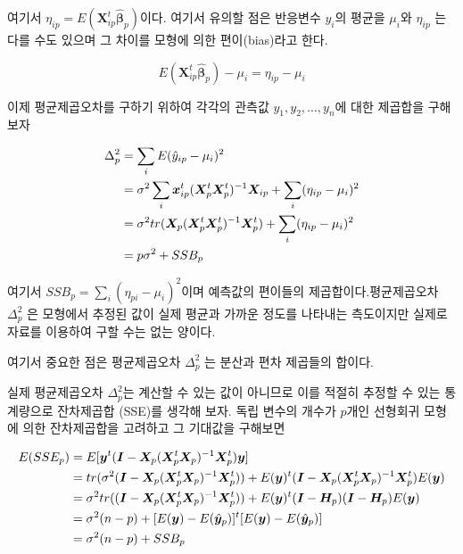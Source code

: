 \documentclass[
  10pt,
]{book}
\theoremstyle{definition}
\theoremstyle{definition}
\theoremstyle{definition}
\theoremstyle{definition}
\theoremstyle{remark}
\begin{document}
여기서 \(\eta_{ip} = E({\bm X}_{ip}^t \hat {\bm \beta}_p)\)이다. 여기서 유의할 점은 반응변수 \(y_i\)의 평균을 \(\mu_i\)와 \(\eta_{ip}\) 는 다를 수도 있으며 그 차이를 모형에 의한 편이(bias)라고 한다.

\[ E({\bm X}_{ip}^t \hat {\bm \beta}_p ) -\mu_i =  \eta_{ip} -\mu_i \]

이제 평균제곱오차를 구하기 위하여 각각의 관측값 \(y_1, y_2,\dots,y_n\)에 대한 제곱합을 구해보자

\begin{align}
\Delta_p^2 &= \sum_i E(\hat y_{ip} -\mu_i)^2   \\
  &= \sigma^2 \sum_i {\bm x}_{ip}^t({\bm X}_p^t {\bm X}_p^t)^{-1} {\bm X}_{ip} + \sum_i (\eta_{ip}-\mu_i)^2 \\ \notag
  & = \sigma^2 tr( {\bm X}_p ({\bm X}_p^t {\bm X}_p^t)^{-1} {\bm X}_p^t ) + \sum_i (\eta_{ip}-\mu_i)^2 \\ \notag
  &= p \sigma^2 + SSB_p
\label{eq:selmse1}  
\end{align}

여기서 \(SSB_p=\sum_i (\eta_{pi}-\mu_i)^2\)이며 예측값의 편이들의 제곱합이다.평균제곱오차 \(\Delta_p^2\) 은 모형에서 추정된 값이 실제 평균과 가까운 정도를 나타내는 측도이지만 실제로 자료를 이용하여 구할 수는 없는 양이다.

여기서 중요한 점은 평균제곱오차 \(\Delta_p^2\) 는 분산과 편차 제곱들의 합이다.

실제 평균제곱오차 \(\Delta_p^2\)는 계산할 수 있는 값이 아니므로 이를 적절히 추정할 수 있는 통계량으로 잔차제곱합 (SSE)를 생각해 보자. 독립 변수의 개수가 \(p\)개인 선형회귀 모형에 의한 잔차제곱합을 고려하고 그 기대값을 구해보면

\begin{align}
E(SSE_p) &= E[ {\bm y}^t ({\bm I} - {\bm X}_p ({\bm X}_p^t {\bm X}_p)^{-1}{\bm X}_p^t) {\bm y} ] \\ \notag
       &= tr( \sigma^2 ({\bm I} - {\bm X}_p ({\bm X}_p^t {\bm X}_p)^{-1}{\bm X}_p^t)) +
         E({\bm y})^t  ({\bm I} - {\bm X}_p ({\bm X}_p^t {\bm X}_p)^{-1}{\bm X}_p^t) E({\bm y}) \\ \notag
      &= \sigma^2 tr(  ({\bm I} - {\bm X}_p ({\bm X}_p^t {\bm X}_p)^{-1}{\bm X}_p^t)) +
             E({\bm y})^t ({\bm I} -\bm H_p)({\bm I} -\bm H_p ) E({\bm y}) \\ \notag 
         &= \sigma^2 (n-p) + [E({\bm y}) - E(\hat {\bm y}_p)]^t [E({\bm y}) - E(\hat {\bm y}_p)] \\
       &= \sigma^2(n-p) + SSB_p
\label{eq:selmse2}       
\end{align}
\end{document}
